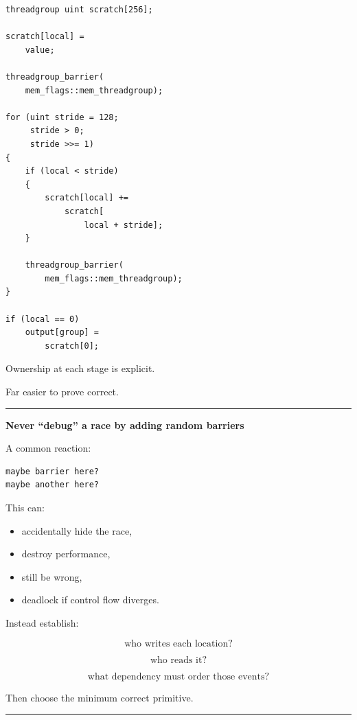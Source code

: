 \protect{}\label{p10-correct-reduction}%
\begin{verbatim}
threadgroup uint scratch[256];

scratch[local] =
    value;

threadgroup_barrier(
    mem_flags::mem_threadgroup);

for (uint stride = 128;
     stride > 0;
     stride >>= 1)
{
    if (local < stride)
    {
        scratch[local] +=
            scratch[
                local + stride];
    }

    threadgroup_barrier(
        mem_flags::mem_threadgroup);
}

if (local == 0)
    output[group] =
        scratch[0];
\end{verbatim}

Ownership at each stage is explicit.

Far easier to prove correct.

\begin{center}\rule{0.5\linewidth}{0.5pt}\end{center}

\textbf{Never ``debug'' a race by adding random barriers}

A common reaction:

\protect{}\label{p10-barrier-everywhere}%
\begin{verbatim}
maybe barrier here?
maybe another here?
\end{verbatim}

This can:

\begin{itemize}
\tightlist
\item
  accidentally hide the race,
\item
  destroy performance,
\item
  still be wrong,
\item
  deadlock if control flow diverges.
\end{itemize}

Instead establish:

\[
\boxed{
\text{who writes each location?}
}
\]

\[
\boxed{
\text{who reads it?}
}
\]

\[
\boxed{
\text{what dependency must order those events?}
}
\]

Then choose the minimum correct primitive.

\begin{center}\rule{0.5\linewidth}{0.5pt}\end{center}

